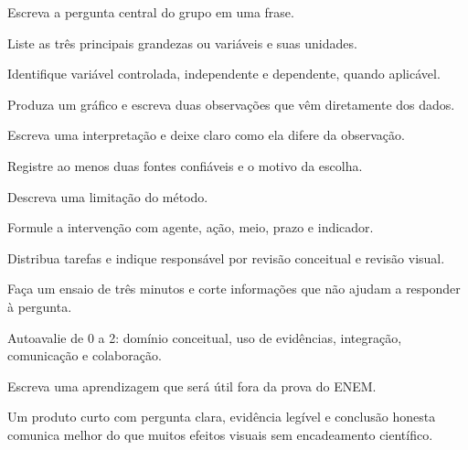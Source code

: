 \documentclass{notaaula}
\begin{document}
\begin{exercicios}
\begin{questoes}
\item Escreva a pergunta central do grupo em uma frase.
\item Liste as três principais grandezas ou variáveis e suas unidades.
\item Identifique variável controlada, independente e dependente, quando aplicável.
\item Produza um gráfico e escreva duas observações que vêm diretamente dos dados.
\item Escreva uma interpretação e deixe claro como ela difere da observação.
\item Registre ao menos duas fontes confiáveis e o motivo da escolha.
\item Descreva uma limitação do método.
\item Formule a intervenção com agente, ação, meio, prazo e indicador.
\item Distribua tarefas e indique responsável por revisão conceitual e revisão visual.
\item Faça um ensaio de três minutos e corte informações que não ajudam a responder à pergunta.
\item Autoavalie de 0 a 2: domínio conceitual, uso de evidências, integração, comunicação e colaboração.
\item Escreva uma aprendizagem que será útil fora da prova do ENEM.
\end{questoes}
\end{exercicios}

\begin{dica}
Um produto curto com pergunta clara, evidência legível e conclusão honesta comunica melhor do que
muitos efeitos visuais sem encadeamento científico.
\end{dica}
\end{document}
